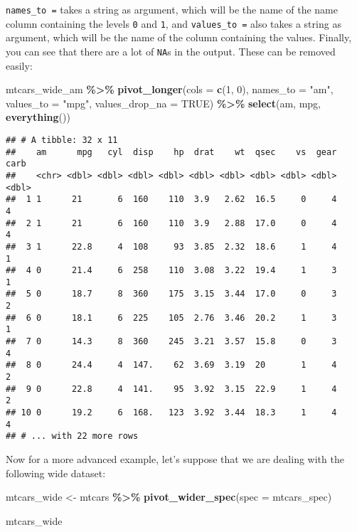\documentclass[
]{article}
\newenvironment{Shaded}{\begin{snugshade}}{\end{snugshade}}
\newcommand{\DataTypeTok}[1]{\textcolor[rgb]{0.13,0.29,0.53}{#1}}
\newcommand{\KeywordTok}[1]{\textcolor[rgb]{0.13,0.29,0.53}{\textbf{#1}}}
\newcommand{\NormalTok}[1]{#1}
\newcommand{\OperatorTok}[1]{\textcolor[rgb]{0.81,0.36,0.00}{\textbf{#1}}}
\newcommand{\OtherTok}[1]{\textcolor[rgb]{0.56,0.35,0.01}{#1}}
\newcommand{\StringTok}[1]{\textcolor[rgb]{0.31,0.60,0.02}{#1}}
\begin{document}
\texttt{names\_to\ =} takes a string as argument, which will be the name of the name column containing the
levels \texttt{0} and \texttt{1}, and \texttt{values\_to\ =} also takes a string as argument, which will be the name of
the column containing the values. Finally, you can see that there are a lot of \texttt{NA}s in the
output. These can be removed easily:

\begin{Shaded}
\begin{Highlighting}[]
\NormalTok{mtcars\_wide\_am }\OperatorTok{\%\textgreater{}\%}\StringTok{ }
\StringTok{  }\KeywordTok{pivot\_longer}\NormalTok{(}\DataTypeTok{cols =} \KeywordTok{c}\NormalTok{(}\StringTok{\textasciigrave{}}\DataTypeTok{1}\StringTok{\textasciigrave{}}\NormalTok{, }\StringTok{\textasciigrave{}}\DataTypeTok{0}\StringTok{\textasciigrave{}}\NormalTok{), }\DataTypeTok{names\_to =} \StringTok{"am"}\NormalTok{, }\DataTypeTok{values\_to =} \StringTok{"mpg"}\NormalTok{, }\DataTypeTok{values\_drop\_na =} \OtherTok{TRUE}\NormalTok{) }\OperatorTok{\%\textgreater{}\%}\StringTok{ }
\StringTok{  }\KeywordTok{select}\NormalTok{(am, mpg, }\KeywordTok{everything}\NormalTok{())}
\end{Highlighting}
\end{Shaded}

\begin{verbatim}
## # A tibble: 32 x 11
##    am      mpg   cyl  disp    hp  drat    wt  qsec    vs  gear  carb
##    <chr> <dbl> <dbl> <dbl> <dbl> <dbl> <dbl> <dbl> <dbl> <dbl> <dbl>
##  1 1      21       6  160    110  3.9   2.62  16.5     0     4     4
##  2 1      21       6  160    110  3.9   2.88  17.0     0     4     4
##  3 1      22.8     4  108     93  3.85  2.32  18.6     1     4     1
##  4 0      21.4     6  258    110  3.08  3.22  19.4     1     3     1
##  5 0      18.7     8  360    175  3.15  3.44  17.0     0     3     2
##  6 0      18.1     6  225    105  2.76  3.46  20.2     1     3     1
##  7 0      14.3     8  360    245  3.21  3.57  15.8     0     3     4
##  8 0      24.4     4  147.    62  3.69  3.19  20       1     4     2
##  9 0      22.8     4  141.    95  3.92  3.15  22.9     1     4     2
## 10 0      19.2     6  168.   123  3.92  3.44  18.3     1     4     4
## # ... with 22 more rows
\end{verbatim}

Now for a more advanced example, let's suppose that we are dealing with the following wide dataset:

\begin{Shaded}
\begin{Highlighting}[]
\NormalTok{mtcars\_wide \textless{}{-}}\StringTok{ }\NormalTok{mtcars }\OperatorTok{\%\textgreater{}\%}\StringTok{ }
\StringTok{    }\KeywordTok{pivot\_wider\_spec}\NormalTok{(}\DataTypeTok{spec =}\NormalTok{ mtcars\_spec)}

\NormalTok{mtcars\_wide}
\end{Highlighting}
\end{Shaded}
\end{document}
